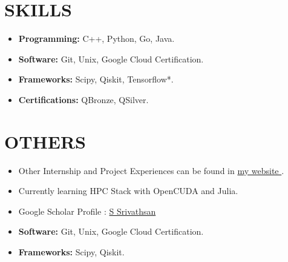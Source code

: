 \documentclass[a4paper,9pt]{extarticle}
\begin{document}
\section*{SKILLS}
\begin{itemize}
    \item \textbf{Programming:} C++, Python, Go, Java.
    \item \textbf{Software:} Git, Unix, Google Cloud Certification.
    \item \textbf{Frameworks:} Scipy, Qiskit, Tensorflow*.
    \item \textbf{Certifications:} QBronze, QSilver.
\end{itemize}

\section*{OTHERS}
\begin{itemize}
    \item Other Internship and Project Experiences can be found in \href{https://www.vathzen.in/}{my website \faExternalLink}.
    \item Currently learning HPC Stack with OpenCUDA and Julia.
    \item Google Scholar Profile : \href{https://scholar.google.com/citations?user=m2CQUnsAAAAJ}{S Srivathsan \faExternalLink}
    \item \textbf{Software:} Git, Unix, Google Cloud Certification.
    \item \textbf{Frameworks:} Scipy, Qiskit.
\end{itemize}
\end{document}
